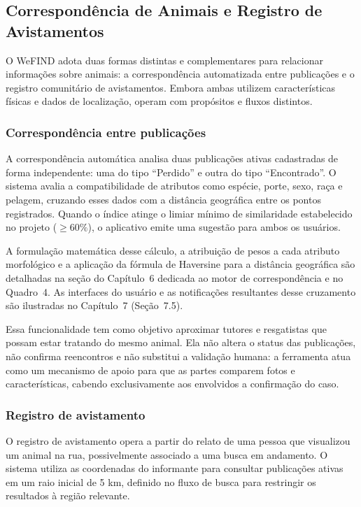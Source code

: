 \subsection{Correspondência de Animais e Registro de Avistamentos}

O WeFIND adota duas formas distintas e complementares para relacionar informações sobre animais: a correspondência automatizada entre publicações e o registro comunitário de avistamentos. Embora ambas utilizem características físicas e dados de localização, operam com propósitos e fluxos distintos.


\subsubsection{Correspondência entre publicações}

A correspondência automática analisa duas publicações ativas cadastradas de forma independente: uma do tipo ``Perdido'' e outra do tipo ``Encontrado''. O sistema avalia a compatibilidade de atributos como espécie, porte, sexo, raça e pelagem, cruzando esses dados com a distância geográfica entre os pontos registrados. Quando o índice atinge o limiar mínimo de similaridade estabelecido no projeto ($\ge 60\%$), o aplicativo emite uma sugestão para ambos os usuários.

A formulação matemática desse cálculo, a atribuição de pesos a cada atributo morfológico e a aplicação da fórmula de Haversine para a distância geográfica são detalhadas na seção do Capítulo~6 dedicada ao motor de correspondência e no Quadro~4. As interfaces do usuário e as notificações resultantes desse cruzamento são ilustradas no Capítulo~7 (Seção~7.5).

Essa funcionalidade tem como objetivo aproximar tutores e resgatistas que possam estar tratando do mesmo animal. Ela não altera o status das publicações, não confirma reencontros e não substitui a validação humana: a ferramenta atua como um mecanismo de apoio para que as partes comparem fotos e características, cabendo exclusivamente aos envolvidos a confirmação do caso.


\subsubsection{Registro de avistamento}

O registro de avistamento opera a partir do relato de uma pessoa que visualizou um animal na rua, possivelmente associado a uma busca em andamento. O sistema utiliza as coordenadas do informante para consultar publicações ativas em um raio inicial de 5 km, definido no fluxo de busca para restringir os resultados à região relevante.

